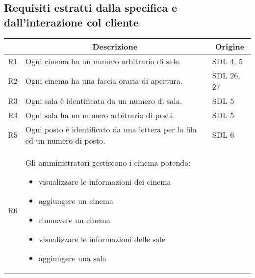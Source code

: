 \pagebreak

\subsection*{Requisiti estratti dalla specifica e dall'interazione col cliente}
%
%

\begin{longtable}{|p{0.8cm}|p{13.4cm}|p{2.1cm}|}
      \hline
      \rowcolor{tblhdrcolor}
      \multicolumn{1}{|c|}{\textbf{Id}}                                       &
      \multicolumn{1}{|c|}{\textbf{Descrizione}}                              &
      \multicolumn{1}{|c|}{\textbf{Origine}}
      \\\hline
      R1                                                                      &
      Ogni cinema ha un numero arbitrario di sale.                            &
      SDL 4, 5
      \\\hline
      R2                                                                      &
      Ogni cinema ha una fascia oraria di apertura.                           &
      SDL 26, 27
      \\\hline
      R3                                                                      &
      Ogni sala è identificata da un numero di sala.                          &
      SDL 5
      \\\hline
      R4                                                                      &
      Ogni sala ha un numero arbitrario di posti.                             &
      SDL 5
      \\\hline
      R5                                                                      &
      Ogni posto è identificato da una lettera per la fila ed un numero
      di posto.                                                               &
      SDL 6
      \\\hline
      R6                                                                      &
      Gli amministratori gestiscono i cinema potendo:
      \begin{itemize}
            \item visualizzare le informazioni dei cinema
            \item aggiungere un cinema
            \item rimuovere un cinema
            \item visualizzare le informazioni delle sale
            \item aggiungere una sala

\end{itemize}
\end{longtable}
